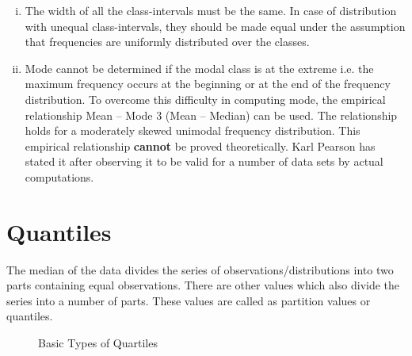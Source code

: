 \documentclass[
10pt, %
a4paper, %
]{report}
\begin{document}
\begin{description}
\begin{enumerate}[Step 1.]
\begin{enumerate}[i.]
\item The width of all the class-intervals must be the same. In case of distribution with unequal class-intervals, they should be made equal under the assumption that frequencies are uniformly distributed over the classes.
\item Mode cannot be determined if the modal class is at the extreme i.e. the maximum frequency occurs at the beginning or at the end of the frequency distribution. To overcome this difficulty in computing mode, the empirical relationship Mean – Mode 3 (Mean – Median) can be used. The relationship holds for a moderately skewed unimodal
frequency distribution. This empirical relationship \textbf{cannot} be proved theoretically. Karl Pearson has stated it after observing it to be valid for a number of data sets by actual computations.
\end{enumerate}
\end{enumerate}
\end{description}

\section*{Quantiles}
The median of the data divides the series of observations/distributions into two parts containing equal observations. There are other values which also divide the series into a number of parts. These values are called as partition values or quantiles.
	
\begin{figure}[h!]
\centering
{}
\caption{Basic Types of Quartiles}
\label{fig:quartiletypes}
\end{figure}
\end{document}
